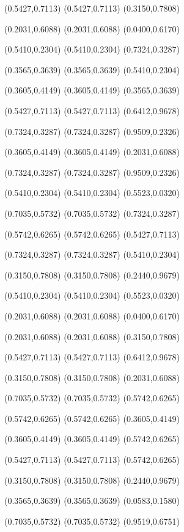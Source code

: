\PST@Border(0.5427,0.7113)
(0.5427,0.7113)
(0.3150,0.7808)

\PST@Border(0.2031,0.6088)
(0.2031,0.6088)
(0.0400,0.6170)

\PST@Border(0.5410,0.2304)
(0.5410,0.2304)
(0.7324,0.3287)

\PST@Border(0.3565,0.3639)
(0.3565,0.3639)
(0.5410,0.2304)

\PST@Border(0.3605,0.4149)
(0.3605,0.4149)
(0.3565,0.3639)

\PST@Border(0.5427,0.7113)
(0.5427,0.7113)
(0.6412,0.9678)

\PST@Border(0.7324,0.3287)
(0.7324,0.3287)
(0.9509,0.2326)

\PST@Border(0.3605,0.4149)
(0.3605,0.4149)
(0.2031,0.6088)

\PST@Border(0.7324,0.3287)
(0.7324,0.3287)
(0.9509,0.2326)

\PST@Border(0.5410,0.2304)
(0.5410,0.2304)
(0.5523,0.0320)

\PST@Border(0.7035,0.5732)
(0.7035,0.5732)
(0.7324,0.3287)

\PST@Border(0.5742,0.6265)
(0.5742,0.6265)
(0.5427,0.7113)

\PST@Border(0.7324,0.3287)
(0.7324,0.3287)
(0.5410,0.2304)

\PST@Border(0.3150,0.7808)
(0.3150,0.7808)
(0.2440,0.9679)

\PST@Border(0.5410,0.2304)
(0.5410,0.2304)
(0.5523,0.0320)

\PST@Border(0.2031,0.6088)
(0.2031,0.6088)
(0.0400,0.6170)

\PST@Border(0.2031,0.6088)
(0.2031,0.6088)
(0.3150,0.7808)

\PST@Border(0.5427,0.7113)
(0.5427,0.7113)
(0.6412,0.9678)

\PST@Border(0.3150,0.7808)
(0.3150,0.7808)
(0.2031,0.6088)

\PST@Border(0.7035,0.5732)
(0.7035,0.5732)
(0.5742,0.6265)

\PST@Border(0.5742,0.6265)
(0.5742,0.6265)
(0.3605,0.4149)

\PST@Border(0.3605,0.4149)
(0.3605,0.4149)
(0.5742,0.6265)

\PST@Border(0.5427,0.7113)
(0.5427,0.7113)
(0.5742,0.6265)

\PST@Border(0.3150,0.7808)
(0.3150,0.7808)
(0.2440,0.9679)

\PST@Border(0.3565,0.3639)
(0.3565,0.3639)
(0.0583,0.1580)

\PST@Border(0.7035,0.5732)
(0.7035,0.5732)
(0.9519,0.6751)

